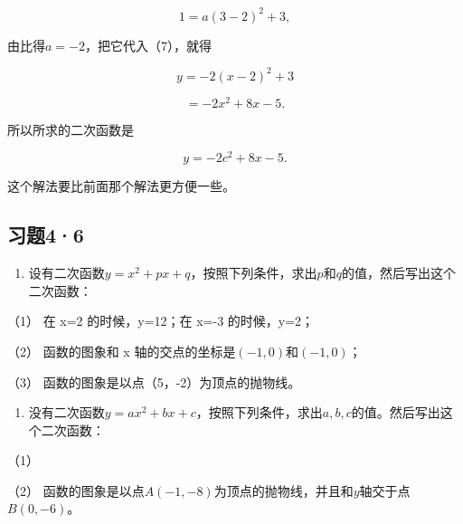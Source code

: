 \[
1 = a (3 - 2)^{2} + 3,
\]

由比得\(a = -2\)，把它代入（7），就得

\[
y = - 2 (x - 2)^{2} + 3
\]

\[
= - 2 x^{2} + 8 x - 5.
\]

所以所求的二次函数是

\[
y = - 2 c^{2} + 8 x - 5.
\]

这个解法要比前面那个解法更方便一些。

\subsection{习题4·6}

\begin{enumerate}
\item
  设有二次函数\(y = x^{2} + px + q\)，按照下列条件，求出\(p\)和\(q\)的值，然后写出这个二次函数：
\end{enumerate}

（1） 在 x=2 的时候，y=12；在 x=-3 的时候，y=2；

（2） 函数的图象和 x 轴的交点的坐标是\((-1, 0)\)和\((-1, 0)\)；

（3） 函数的图象是以点（5，-2）为顶点的抛物线。

\begin{enumerate}[start=2]
\item
  没有二次函数\(y = ax^2 + bx + c\)，按照下列条件，求出\(a, b, c\)的值。然后写出这个二次函数：
\end{enumerate}

（1）

\begin{figure}
\centering
\end{figure}

（2）
函数的图象是以点\(A(-1, -8)\)为顶点的抛物线，并且和\(y\)轴交于点\(B(0, -6)\)。

